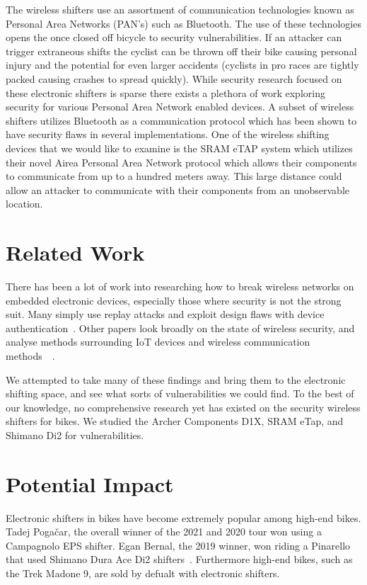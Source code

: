 \documentclass[letterpaper,twocolumn,10pt]{article}
\begin{document}
The wireless shifters use an assortment of communication technologies known as Personal Area Networks (PAN’s) such as Bluetooth. The use of these technologies opens the once closed off bicycle to security vulnerabilities. If an attacker can trigger extraneous shifts the cyclist can be thrown off their bike causing personal injury and the potential for even larger accidents (cyclists in pro races are tightly packed causing crashes to spread quickly). While security research focused on these electronic shifters is sparse there exists a plethora of work exploring security for various Personal Area Network enabled devices. A subset of wireless shifters utilizes Bluetooth as a communication protocol which has been shown to have security flaws in several implementations. One of the wireless shifting devices that we would like to examine is the SRAM eTAP system which utilizes their novel Airea Personal Area Network protocol which allows their components to communicate from up to a hundred meters away. This large distance could allow an attacker to communicate with their components from an unobservable location.

\section{Related Work}

There has been a lot of work into researching how to break wireless networks on embedded electronic devices, especially those where security is not the strong suit. Many simply use replay attacks and exploit design flaws with device authentication~\cite{Halperin}. Other papers look broadly on the state of wireless security, and analyse methods surrounding IoT devices and wireless communication methods~\cite{Choi}~\cite{Radek}.

We attempted to take many of these findings and bring them to the electronic shifting space, and see what sorts of vulnerabilities we could find. To the best of our knowledge, no comprehensive research yet has existed on the security wireless shifters for bikes. We studied the Archer Components D1X, SRAM eTap, and Shimano Di2 for vulnerabilities.

\section{Potential Impact}

Electronic shifters in bikes have become extremely popular among high-end bikes. Tadej Pogačar, the overall winner of the 2021 and 2020 tour won using a Campagnolo EPS shifter. Egan Bernal, the 2019 winner, won riding a Pinarello that used Shimano Dura Ace Di2 shifters~\cite{GCNTech}. Furthermore high-end bikes, such as the Trek Madone 9, are sold by defualt with electronic shifters.
\end{document}
